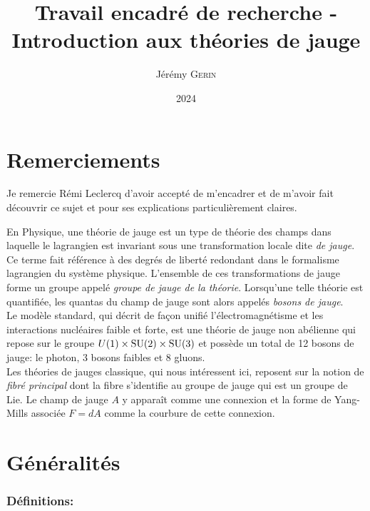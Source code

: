 \documentclass[12pt, a4paper]{book}
\title{Travail encadré de recherche - Introduction aux théories de jauge}
\author{Jérémy \textsc{Gerin}}
\date{2024}
\begin{document}
\frontmatter

\mainmatter
\maketitle
\sommaire

\newpage

\section*{Remerciements}

Je remercie Rémi Leclercq d'avoir accepté de m'encadrer et de m'avoir fait découvrir ce sujet et pour ses explications particulièrement claires.

\newpage

En Physique, une théorie de jauge est un type de théorie des champs dans laquelle le lagrangien est invariant sous une transformation locale dite \emph{de jauge}. Ce terme fait référence à des degrés de liberté redondant dans le formalisme lagrangien du système physique. L'ensemble de ces transformations de jauge forme un groupe appelé \emph{groupe de jauge de la théorie}. Lorsqu'une telle théorie est quantifiée, les quantas du champ de jauge sont alors appelés \emph{bosons de jauge}. \\

Le modèle standard, qui décrit de façon unifié l'électromagnétisme et les interactions nucléaires faible et forte, est une théorie de jauge non abélienne qui repose sur le groupe $U(1)\times \operatorname{SU}(2) \times \operatorname{SU}(3)$ et possède un total de 12 bosons de jauge: le photon, 3 bosons faibles et 8 gluons. \\

Les théories de jauges classique, qui nous intéressent ici, reposent sur la notion de \emph{fibré principal} dont la fibre s'identifie au groupe de jauge qui est un groupe de Lie. Le champ de jauge $A$ y apparaît comme une connexion et la forme de Yang-Mills associée $F = dA$ comme la courbure de cette connexion. 

\section{Généralités}

\subsubsection{Définitions:}
\end{document}
